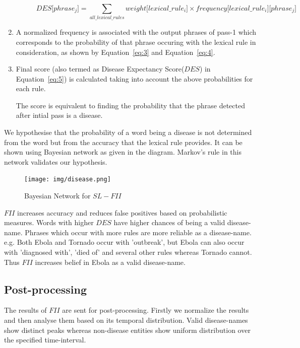 \documentclass{article}
\begin{document}
\begin{enumerate}
\begin{figure}[t!]
\begin{equation}
DES \lbrack phrase_j \rbrack = \sum_{all\_lexical\_rules} weight \lbrack lexical\_rule_i \rbrack \times frequency \lbrack lexical\_rule_i \rbrack \lbrack phrase_j \rbrack  
\label{eq:5}
\end{equation}




\hrulefill
\end{figure}


\item A normalized frequency is associated with the output phrases of pass-1 which corresponds to the probability of that phrase occuring with the lexical rule in consideration, as shown by Equation~\ref{eq:3} and Equation~\ref{eq:4}. 




\item Final score (also termed as Disease Expectancy Score($DES$) in Equation~\ref{eq:5}) is calculated taking into account the above probabilities for each rule. 

The score is equivalent to finding the probability that the phrase detected after intial pass is a disease.


\end{enumerate}

We hypothesise that the probability of a word being a disease is not determined from the word but from the accuracy that the lexical rule provides.
It can be shown using Bayesian network as given in the diagram. Markov's rule in this network validates our hypothesis. 

\begin{figure}[h]
\centering
\texttt{[image: img/disease.png]}
\caption{Bayesian Network for $SL-FII$}
\label{fig:disease}
\end{figure}

$FII$ increases accuracy and reduces false positives based on probabilistic measures. Words with higher $DES$ have higher chances of being a valid disease-name. Phrases which occur with more rules are more reliable as a disease-name. 
e.g. Both Ebola and Tornado occur with 'outbreak', but Ebola can also occur with 'diagnosed with', 'died of' and several other rules whereas Tornado cannot. Thus $FII$ increases belief in Ebola as a valid disease-name. 

\subsection{Post-processing}
The results of $FII$ are sent for post-processing. Firstly we normalize the results and then analyse them based on its temporal distribution. Valid disease-names show distinct peaks whereas non-disease entities show uniform distribution over the specified time-interval. 
\end{document}
